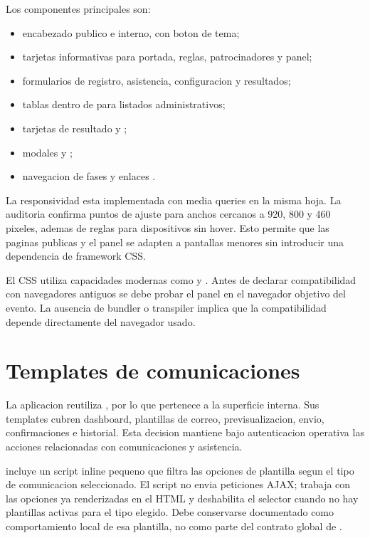 Los componentes principales son:

\begin{itemize}
  \item encabezado publico e interno, con boton de tema;
  \item tarjetas informativas para portada, reglas, patrocinadores y panel;
  \item formularios de registro, asistencia, configuracion y resultados;
  \item tablas dentro de  para listados administrativos;
  \item tarjetas de resultado  y ;
  \item modales  y ;
  \item navegacion de fases  y enlaces .
\end{itemize}

La responsividad esta implementada con media queries en la misma hoja. La auditoria confirma puntos de ajuste para anchos cercanos a 920, 800 y 460 pixeles, ademas de reglas para dispositivos sin hover. Esto permite que las paginas publicas y el panel se adapten a pantallas menores sin introducir una dependencia de framework CSS.

\begin{advertencia}
El CSS utiliza capacidades modernas como  y . Antes de declarar compatibilidad con navegadores antiguos se debe probar el panel en el navegador objetivo del evento. La ausencia de bundler o transpiler implica que la compatibilidad depende directamente del navegador usado.
\end{advertencia}

\section{Templates de comunicaciones}
\label{sec:frontend-comunicaciones}

La aplicacion  reutiliza , por lo que pertenece a la superficie interna. Sus templates cubren dashboard, plantillas de correo, previsualizacion, envio, confirmaciones e historial. Esta decision mantiene bajo autenticacion operativa las acciones relacionadas con comunicaciones y asistencia.

 incluye un script inline pequeno que filtra las opciones de plantilla segun el tipo de comunicacion seleccionado. El script no envia peticiones AJAX; trabaja con las opciones ya renderizadas en el HTML y deshabilita el selector cuando no hay plantillas activas para el tipo elegido. Debe conservarse documentado como comportamiento local de esa plantilla, no como parte del contrato global de .


